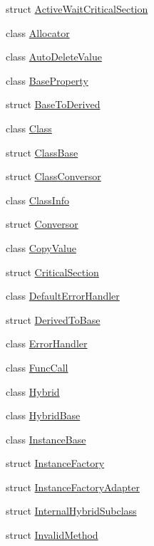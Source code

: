 \begin{DoxyCompactItemize}
\item 
struct \hyperlink{structSLB_1_1ActiveWaitCriticalSection}{Active\+Wait\+Critical\+Section}
\item 
class \hyperlink{classSLB_1_1Allocator}{Allocator}
\item 
class \hyperlink{classSLB_1_1AutoDeleteValue}{Auto\+Delete\+Value}
\item 
class \hyperlink{classSLB_1_1BaseProperty}{Base\+Property}
\item 
struct \hyperlink{structSLB_1_1BaseToDerived}{Base\+To\+Derived}
\item 
class \hyperlink{classSLB_1_1Class}{Class}
\item 
struct \hyperlink{structSLB_1_1ClassBase}{Class\+Base}
\item 
struct \hyperlink{structSLB_1_1ClassConversor}{Class\+Conversor}
\item 
class \hyperlink{classSLB_1_1ClassInfo}{Class\+Info}
\item 
struct \hyperlink{structSLB_1_1Conversor}{Conversor}
\item 
class \hyperlink{classSLB_1_1CopyValue}{Copy\+Value}
\item 
struct \hyperlink{structSLB_1_1CriticalSection}{Critical\+Section}
\item 
class \hyperlink{classSLB_1_1DefaultErrorHandler}{Default\+Error\+Handler}
\item 
struct \hyperlink{structSLB_1_1DerivedToBase}{Derived\+To\+Base}
\item 
class \hyperlink{classSLB_1_1ErrorHandler}{Error\+Handler}
\item 
class \hyperlink{classSLB_1_1FuncCall}{Func\+Call}
\item 
class \hyperlink{classSLB_1_1Hybrid}{Hybrid}
\item 
class \hyperlink{classSLB_1_1HybridBase}{Hybrid\+Base}
\item 
class \hyperlink{classSLB_1_1InstanceBase}{Instance\+Base}
\item 
struct \hyperlink{structSLB_1_1InstanceFactory}{Instance\+Factory}
\item 
struct \hyperlink{structSLB_1_1InstanceFactoryAdapter}{Instance\+Factory\+Adapter}
\item 
struct \hyperlink{structSLB_1_1InternalHybridSubclass}{Internal\+Hybrid\+Subclass}
\item 
struct \hyperlink{structSLB_1_1InvalidMethod}{Invalid\+Method}
\item 

\end{DoxyCompactItemize}

